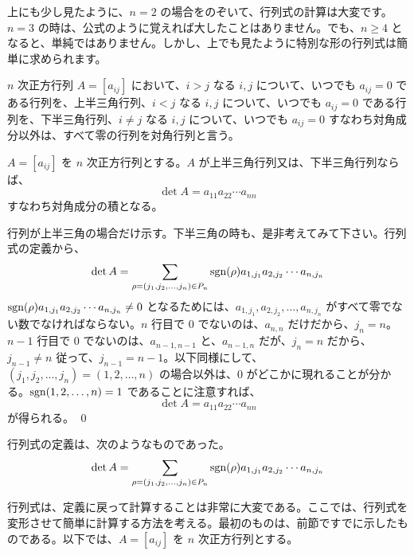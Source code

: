 上にも少し見たように、$n =2$ の場合をのぞいて、行列式の計算は大変です。$n=3$ の時は、公式のように覚えれば大したことはありません。でも、$n\geq 4$ となると、単純ではありません。しかし、上でも見たように特別な形の行列式は簡単に求められます。

\begin{definition}
$n$ 次正方行列 $A = [a_{ij}]$ において、$i>j$ なる $i,j$ について、いつでも $a_{ij} = 0$ である行列を、{\gt 上半三角行列}、$i<j$ なる $i,j$ について、いつでも $a_{ij} = 0$ である行列を、{\gt 下半三角行列}、$i\neq j$ なる $i,j$  について、いつでも $a_{ij} = 0$ すなわち対角成分以外は、すべて零の行列を{\gt 対角行列}と言う。
\end{definition}

\begin{prop}
$A = [a_{ij}]$ を $n$ 次正方行列とする。$A$ が上半三角行列又は、下半三角行列ならば、
$$\det A = a_{11}a_{22}\cdots a_{nn}$$
すなわち対角成分の積となる。
\end{prop}
\proof
行列が上半三角の場合だけ示す。下半三角の時も、是非考えてみて下さい。行列式の定義から、
$$\det A = \sum_{\rho = (j_1,j_2,\ldots,j_n)\in P_n} \mbox{{\rm sgn}}(\rho)a_{1,j_1}a_{2,j_2}\cdots a_{n,j_n}$$
$\mbox{{\rm sgn}}(\rho)a_{1,j_1}a_{2,j_2}\cdots a_{n,j_n} \neq 0$ となるためには、$a_{1,j_1}, a_{2,j_2}, \ldots, a_{n,j_n}$ がすべて零でない数でなければならない。$n$ 行目で $0$ でないのは、$a_{n,n}$ だけだから、$j_n = n$。$n-1$ 行目で $0$ でないのは、$a_{n-1,n-1}$ と、$a_{n-1,n}$ だが、$j_n = n$ だから、$j_{n-1}\neq n$ 従って、$j_{n-1} = n-1$。以下同様にして、$(j_1, j_2, \ldots, j_n) = (1,2,\ldots, n)$ の場合以外は、$0$ がどこかに現れることが分かる。$\mbox{{\rm sgn}}(1,2,\ldots, n) = 1$ であることに注意すれば、
$$\det A = a_{11}a_{22}\cdots a_{nn}$$
が得られる。
\qed

\newpage
{}
行列式の定義は、次のようなものであった。
$$\det A = \sum_{\rho = (j_1,j_2,\ldots,j_n)\in P_n} \mbox{{\rm sgn}}(\rho)a_{1,j_1}a_{2,j_2}\cdots a_{n,j_n}$$

行列式は、定義に戻って計算することは非常に大変である。ここでは、行列式を変形させて簡単に計算する方法を考える。最初のものは、前節ですでに示したものである。以下では、$A = [a_{ij}]$ を $n$ 次正方行列とする。

